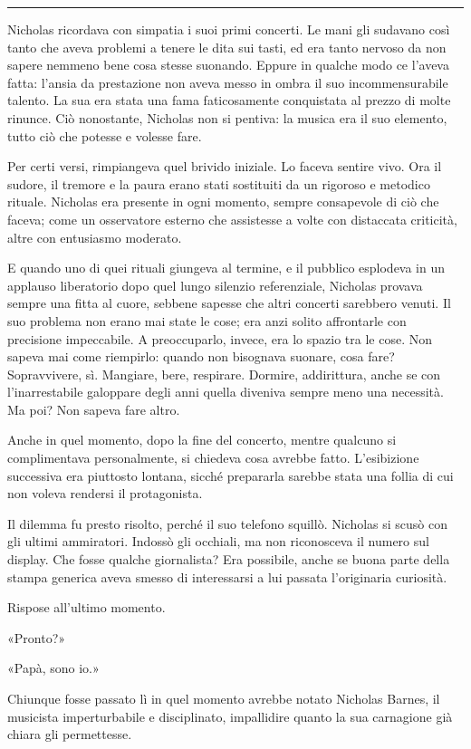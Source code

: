 \documentclass[a4paper,oneside,11pt]{memoir}
\begin{document}
\plainbreak{1}

Nicholas ricordava con simpatia i suoi primi concerti. Le mani gli sudavano così tanto che aveva problemi a tenere le
dita sui tasti, ed era tanto nervoso da non sapere nemmeno bene cosa stesse suonando. Eppure in qualche modo ce l'aveva
fatta: l'ansia da prestazione non aveva messo in ombra il suo incommensurabile talento. La sua era stata una fama
faticosamente conquistata al prezzo di molte rinunce. Ciò nonostante, Nicholas non si pentiva: la musica era il suo
elemento, tutto ciò che potesse e volesse fare.

Per certi versi, rimpiangeva quel brivido iniziale. Lo faceva sentire vivo. Ora il sudore, il tremore e la paura erano
stati sostituiti da un rigoroso e metodico rituale. Nicholas era presente in ogni momento, sempre consapevole di ciò che
faceva; come un osservatore esterno che assistesse a volte con distaccata criticità, altre con entusiasmo moderato.

E quando uno di quei rituali giungeva al termine, e il pubblico esplodeva in un applauso liberatorio dopo quel lungo
silenzio referenziale, Nicholas provava sempre una fitta al cuore, sebbene sapesse che altri concerti sarebbero venuti.
Il suo problema non erano mai state le cose; era anzi solito affrontarle con precisione impeccabile. A preoccuparlo,
invece, era lo spazio tra le cose. Non sapeva mai come riempirlo: quando non bisognava suonare, cosa fare? Sopravvivere,
sì. Mangiare, bere, respirare. Dormire, addirittura, anche se con l'inarrestabile galoppare degli anni quella diveniva
sempre meno una necessità. Ma poi? Non sapeva fare altro.

Anche in quel momento, dopo la fine del concerto, mentre qualcuno si complimentava personalmente, si chiedeva cosa
avrebbe fatto. L'esibizione successiva era piuttosto lontana, sicché prepararla sarebbe stata una follia di cui non
voleva rendersi il protagonista.

Il dilemma fu presto risolto, perché il suo telefono squillò. Nicholas si scusò con gli ultimi ammiratori. Indossò gli
occhiali, ma non riconosceva il numero sul display. Che fosse qualche giornalista? Era possibile, anche se buona parte
della stampa generica aveva smesso di interessarsi a lui passata l'originaria curiosità.

Rispose all'ultimo momento.

«Pronto?»

«Papà, sono io.»

Chiunque fosse passato lì in quel momento avrebbe notato Nicholas Barnes, il musicista imperturbabile e disciplinato,
impallidire quanto la sua carnagione già chiara gli permettesse.
\end{document}
